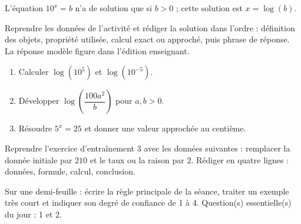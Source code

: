 \begin{traceecrite}L'équation $10^x=b$ n'a de solution que si $b>0$ ; cette solution est $x=\log(b)$.\end{traceecrite}

\begin{exemple}
Reprendre les données de l'activité et rédiger la solution dans l'ordre : définition des objets, propriété utilisée, calcul exact ou approché, puis phrase de réponse. La réponse modèle figure dans l'édition enseignant.
\end{exemple}

\begin{exercice}[-- essentiel]
\begin{enumerate}\item Calculer $\log(10^5)$ et $\log(10^{-5})$.\item Développer $\log\!\left(\dfrac{100a^2}{b}\right)$ pour $a,b>0$.\item Résoudre $5^x=25$ et donner une valeur approchée au centième.\end{enumerate}
\end{exercice}


\begin{dm}Reprendre l'exercice d'entraînement 3 avec les données suivantes : remplacer la donnée initiale par $210$ et le taux ou la raison par $2$. Rédiger en quatre lignes : données, formule, calcul, conclusion.\end{dm}

\begin{sortie}Sur une demi-feuille : écrire la règle principale de la séance, traiter un exemple très court et indiquer son degré de confiance de 1 à 4. Question(s) essentielle(s) du jour : 1 et 2.\end{sortie}

